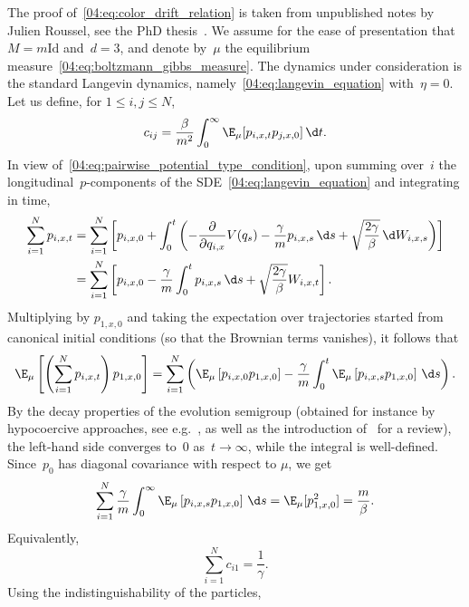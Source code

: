 \label{04:appendix:color_drift}
The proof of~\eqref{04:eq:color_drift_relation} is taken from unpublished notes by Julien Roussel, see the PhD thesis~\cite{R18}.
We assume for the ease of presentation that~$M=m\mathrm{Id}$ and~$d=3$, and denote by~$\mu$ the equilibrium measure~\eqref{04:eq:boltzmann_gibbs_measure}. The dynamics under consideration is the standard Langevin dynamics, namely~\eqref{04:eq:langevin_equation} with~$\eta=0$. Let us define, for $1\leq i,j\leq N$,
\[c_{ij}=\frac{\beta}{m^2} \int_{0}^\infty \E_\mu[p_{i,x,t}p_{j,x,0}]\,\d t.\]
In view of~\eqref{04:eq:pairwise_potential_type_condition}, upon summing over~$i$ the longitudinal~$p$-components of the SDE~\eqref{04:eq:langevin_equation} and integrating in time,
\begin{align*}\sum_{i=1}^N p_{i,x,t}&= \sum_{i=1}^N \left[p_{i,x,0}+\int_0^t \left(-\frac{\partial}{\partial q_{i,x}}V(q_s)-\frac{\gamma}{m} p_{i,x,s}\,\d s +\sqrt{\frac{2\gamma}\beta}\,\d W_{i,x,s}\right)\right]\\
    &=\sum_{i=1}^N \left[p_{i,x,0}-\frac{\gamma}{m}\int_0^t  p_{i,x,s}\,\d s +\sqrt{\frac{2\gamma}\beta} W_{i,x,t}\right].\end{align*}
Multiplying by $p_{1,x,0}$ and taking the expectation over trajectories started from canonical initial conditions (so that the Brownian terms vanishes), it follows that
\begin{equation}
    \E_\mu\left[\left(\sum_{i=1}^N p_{i,x,t}\right)p_{1,x,0}\right]=\sum_{i=1}^N\left( \E_\mu\left[p_{i,x,0}p_{1,x,0}\right]-\frac{\gamma}{m}\int_0^t \E_\mu\left[p_{i,x,s}p_{1,x,0}\right]\,\d s\right).
\end{equation}
By the decay properties of the evolution semigroup (obtained for instance by hypocoercive approaches, see e.g.~\cite{V06}, as well as the introduction of~\cite{BFLS22} for a review), the left-hand side converges to~$0$ as~$t\to \infty$, while the integral is well-defined. Since~$p_0$ has diagonal covariance with respect to $\mu$, we get
\begin{equation}
    \sum_{i=1}^N \frac{\gamma}m\int_0^\infty \E_\mu\left[p_{i,x,s}p_{1,x,0}\right]\,\d s=\E_\mu[p_{1,x,0}^2]=\frac{m}{\beta}.
\end{equation}
Equivalently, 
\begin{equation}
\label{04:eq:color_drift_relation_proof}
\sum_{i=1}^N c_{i1}=\frac{1}{\gamma}.\end{equation}
Using the indistinguishability of the particles,
